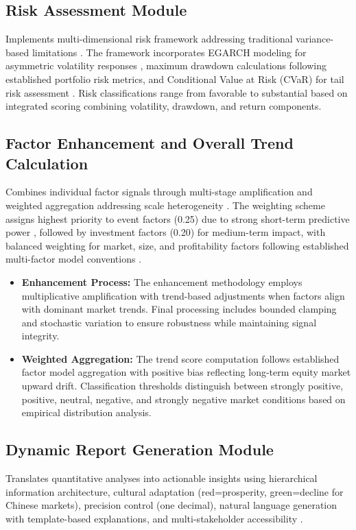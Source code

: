 \documentclass[3p,times,procedia]{elsarticle}
\begin{document}
\subsection{{Risk Assessment Module}}
\vspace{-2pt}
Implements multi-dimensional risk framework addressing traditional variance-based limitations \cite{Jorion2001,Rockafellar2000}. The framework incorporates EGARCH modeling for asymmetric volatility responses \cite{Nelson1991}, maximum drawdown calculations following established portfolio risk metrics, and Conditional Value at Risk (CVaR) for tail risk assessment \cite{Rockafellar2000}. Risk classifications range from favorable to substantial based on integrated scoring combining volatility, drawdown, and return components.

\subsection{{Factor Enhancement and Overall Trend Calculation}}
\vspace{-2pt}
Combines individual factor signals through multi-stage amplification and weighted aggregation addressing scale heterogeneity \cite{Harvey2016,FAMA1993}. The weighting scheme assigns highest priority to event factors (0.25) due to strong short-term predictive power \cite{Daniel1998}, followed by investment factors (0.20) for medium-term impact, with balanced weighting for market, size, and profitability factors following established multi-factor model conventions \cite{FAMA1993,Carhart1997}.

\begin{itemize}\setlength{\itemsep}{2pt}
\item \textbf{Enhancement Process:} The enhancement methodology employs multiplicative amplification with trend-based adjustments when factors align with dominant market trends. Final processing includes bounded clamping and stochastic variation to ensure robustness while maintaining signal integrity.

\item \textbf{Weighted Aggregation:} The trend score computation follows established factor model aggregation with positive bias reflecting long-term equity market upward drift. Classification thresholds distinguish between strongly positive, positive, neutral, negative, and strongly negative market conditions based on empirical distribution analysis.
\end{itemize}

\subsection{Dynamic Report Generation Module}
\vspace{-2pt}
Translates quantitative analyses into actionable insights using hierarchical information architecture, cultural adaptation (red=prosperity, green=decline for Chinese markets), precision control (one decimal), natural language generation with template-based explanations, and multi-stakeholder accessibility \cite{Ribeiro2016,Harvey2016}.
\end{document}
